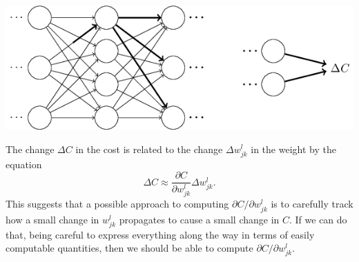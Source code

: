 \documentclass[a4paper,twoside,10pt]{book}
\begin{document}
\begin{center}
	\includegraphics[scale=0.5]{./figures/ch2/tikz25}
\end{center}
The change $\Delta{}C$ in the cost is related to the change $\Delta{}w^l_{jk}$ in the weight by the equation
\begin{equation}
	\Delta C \approx \frac{\partial C}{\partial w^l_{jk}} \Delta w^l_{jk}.
	\label{eq:47}
\end{equation}
This suggests that a possible approach to computing $\partial{}C/\partial{}w^l_{jk}$ is to carefully track how a small change in $w^l_{jk}$ propagates to cause a small change in $C$. If we can do that, being careful to express everything along the way in terms of easily computable quantities, then we should be able to compute $\partial{}C/\partial{}w^l_{jk}$.
\end{document}
